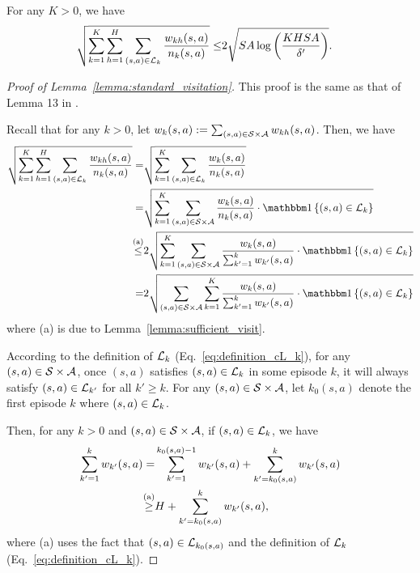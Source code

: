 \begin{lemma} \label{lemma:standard_visitation}
	For any $K>0$, we have 
	\begin{align*}
		\sqrt{\sum_{k=1}^{K} \sum_{h=1}^{H} \sum_{(s,a) \in \mathcal{L}_k} \frac{w_{kh}(s,a)}{n_k(s,a)}} \leq &  2 \sqrt{ SA \log \left( \frac{KHSA}{\delta'} \right) } .
	\end{align*}
\end{lemma}
\begin{proof}[Proof of Lemma~\ref{lemma:standard_visitation}]
	This proof is the same as that of Lemma 13 in \citep{zanette2019tighter}.
	
	Recall that for any $k>0$, let $w_{k}(s,a):=\sum_{(s,a) \in \mathcal{S} \times \mathcal{A}} w_{kh}(s,a)$. Then, we have
	\begin{align*}
		\sqrt{\sum_{k=1}^{K} \sum_{h=1}^{H} \sum_{(s,a) \in \cL_k} \frac{w_{kh}(s,a)}{n_k(s,a)}} = & \sqrt{\sum_{k=1}^{K} \sum_{(s,a) \in \cL_k} \frac{w_{k}(s,a)}{n_k(s,a)}}
		\nonumber\\
		= & \sqrt{\sum_{k=1}^{K} \sum_{(s,a) \in \cS \times \cA} \frac{w_{k}(s,a)}{n_k(s,a)} \cdot \indicator{ (s,a) \in \cL_k }}
		\nonumber\\
		\overset{\textup{(a)}}{\leq} & 2 \sqrt{\sum_{k=1}^{K} \sum_{(s,a) \in \cS \times \cA} \frac{w_{k}(s,a)}{ \sum_{k'=1}^{k} w_{k'}(s,a) } \cdot \indicator{ (s,a) \in \cL_k }} 
		\nonumber\\
		= & 2 \sqrt{\sum_{(s,a) \in \cS \times \cA} \sum_{k=1}^{K} \frac{w_{k}(s,a)}{ \sum_{k'=1}^{k} w_{k'}(s,a) } \cdot \indicator{ (s,a) \in \cL_k }}
	\end{align*}
	where (a) is due to Lemma~\ref{lemma:sufficient_visit}.
	
	According to the definition of $\mathcal{L}_k$ (Eq.~\eqref{eq:definition_cL_k}), for any $(s,a) \in \mathcal{S} \times \mathcal{A}$, once $(s,a)$ satisfies $(s,a) \in \mathcal{L}_k$ in some episode $k$, it will always satisfy $(s,a) \in \mathcal{L}_{k'}$ for all $k' \geq k$. For any $(s,a) \in \mathcal{S} \times \mathcal{A}$, let $k_0(s,a)$ denote the first episode $k$ where $(s,a) \in \mathcal{L}_k$.
	
	Then, for any $k>0$ and $(s,a) \in \mathcal{S} \times \mathcal{A}$, if $(s,a) \in \mathcal{L}_k$, we have
	\begin{align*}
		\sum_{k'=1}^{k} w_{k'}(s,a) = & \sum_{k'=1}^{k_0(s,a)-1} w_{k'}(s,a) + \sum_{k'=k_0(s,a)}^{k} w_{k'}(s,a)
		\\
		\overset{\textup{(a)}}{\geq} & H + \sum_{k'=k_0(s,a)}^{k} w_{k'}(s,a) ,
	\end{align*}
	where (a) uses the fact that $(s,a) \in \mathcal{L}_{k_0(s,a)}$ and the definition of $\mathcal{L}_k$ (Eq.~\eqref{eq:definition_cL_k}).
	

\end{proof}
